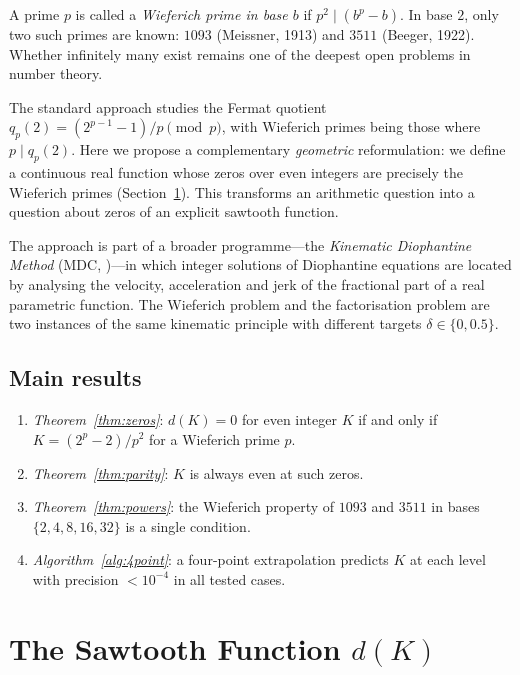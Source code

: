 \documentclass[12pt,a4paper]{article}
\theoremstyle{definition}
\theoremstyle{remark}
\begin{document}
A prime $p$ is called a \emph{Wieferich prime in base $b$} if
$p^2 \mid (b^p - b)$.
In base $2$, only two such primes are known: $1093$ (Meissner, 1913)
and $3511$ (Beeger, 1922). Whether infinitely many exist remains one of
the deepest open problems in number theory.

The standard approach studies the Fermat quotient
$q_p(2) = (2^{p-1}-1)/p \pmod{p}$, with Wieferich primes being those
where $p \mid q_p(2)$. Here we propose a complementary
\emph{geometric} reformulation: we define a continuous real function
whose zeros over even integers are precisely the Wieferich primes
(Section~\ref{sec:sawtooth}). This transforms an arithmetic question
into a question about zeros of an explicit sawtooth function.

The approach is part of a broader programme---the
\emph{Kinematic Diophantine Method} (MDC, \cite{VMA2026MDC})---in which
integer solutions of Diophantine equations are located by analysing the
velocity, acceleration and jerk of the fractional part of a real
parametric function. The Wieferich problem and the factorisation
problem are two instances of the same kinematic principle with
different targets $\delta \in \{0, 0.5\}$.

\subsection*{Main results}

\begin{enumerate}[label=(\roman*)]
  \item \emph{Theorem~\ref{thm:zeros}}: $d(K)=0$ for even integer $K$
        if and only if $K = (2^p-2)/p^2$ for a Wieferich prime $p$.
  \item \emph{Theorem~\ref{thm:parity}}: $K$ is always even at such zeros.
  \item \emph{Theorem~\ref{thm:powers}}: the Wieferich property of
        $1093$ and $3511$ in bases $\{2,4,8,16,32\}$ is a single
        condition.
  \item \emph{Algorithm~\ref{alg:4point}}: a four-point extrapolation
        predicts $K$ at each level with precision $< 10^{-4}$ in all
        tested cases.
\end{enumerate}

\section{The Sawtooth Function \texorpdfstring{$d(K)$}{d(K)}}
\label{sec:sawtooth}
\end{document}
